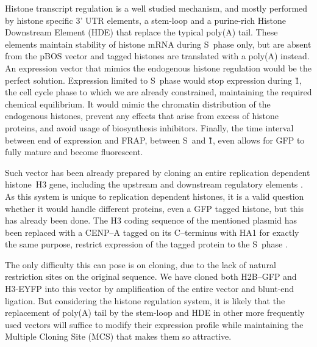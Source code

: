       Histone transcript regulation is a well studied mechanism,
      and mostly performed by histone specific 3' UTR elements,
      a stem-loop and a purine-rich Histone Downstream Element (HDE) that
      replace the typical poly(A) tail. These elements maintain stability
      of histone mRNA during S~phase only, but are absent from the
      pBOS vector and tagged histones are translated with a poly(A) instead.
      An expression vector that mimics the endogenous histone regulation
      would be the perfect solution. Expression limited to S~phase would
      stop expression during \G1{}, the cell cycle phase to which we are
      already constrained, maintaining the required chemical equilibrium.
      It would mimic the chromatin distribution of the endogenous histones,
      prevent any effects that arise from excess of histone proteins, and
      avoid usage of biosynthesis inhibitors. Finally, the time interval
      between end of expression and FRAP, between S~and \G1{}, even allows
      for GFP to fully mature and become fluorescent.

      Such vector has been already prepared by cloning an entire replication
      dependent histone~H3 gene, including the upstream and downstream
      regulatory elements \citep{pMH3-plasmid}. As this system is unique to
      replication dependent histones, it is a valid question whether it
      would handle different proteins, even a GFP tagged histone, but
      this has already been done. The H3 coding sequence of the mentioned
      plasmid has been replaced with a CENP--A tagged on its C--terminus with
      HA1 for exactly the same purpose, restrict expression of the
      tagged protein to the S~phase \citep{Kevin-pCA-TAG}.

      The only difficulty this can pose is on cloning, due to the lack of natural
      restriction sites on the original sequence. We have cloned both H2B--GFP
      and H3-EYFP into this vector by amplification of the entire vector and
      blunt-end ligation. But considering the histone regulation system, it is likely
      that the replacement of poly(A) tail by the stem-loop and HDE
      in other more frequently used vectors will suffice to
      modify their expression profile while maintaining the Multiple Cloning
      Site (MCS) that makes them so attractive.


